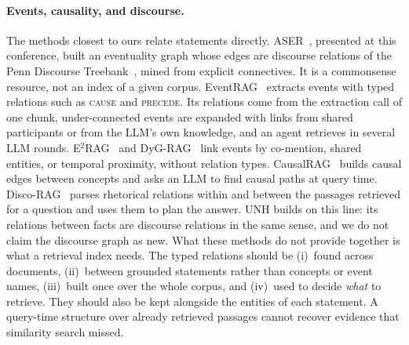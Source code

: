 \documentclass[sigconf, review, anonymous]{acmart}
\newcommand{\sys}{UNH}
\newcommand{\rel}[1]{\textsc{#1}}            %
\begin{document}
\paragraph{Events, causality, and discourse.}
The methods closest to ours relate statements directly. ASER~\cite{zhang2020aser}, presented at this conference, built an eventuality graph whose edges are discourse relations of the Penn Discourse Treebank~\cite{prasad2017penn}, mined from explicit connectives. It is a commonsense resource, not an index of a given corpus. EventRAG~\cite{yang2025eventrag} extracts events with typed relations such as \rel{cause} and \rel{precede}. Its relations come from the extraction call of one chunk, under-connected events are expanded with links from shared participants or from the LLM's own knowledge, and an agent retrieves in several LLM rounds. E$^2$RAG~\cite{zhang2026e2rag} and DyG-RAG~\cite{sun2025dygrag} link events by co-mention, shared entities, or temporal proximity, without relation types. CausalRAG~\cite{wang2025causalrag} builds causal edges between concepts and asks an LLM to find causal paths at query time. Disco-RAG~\cite{liu2026discorag} parses rhetorical relations within and between the passages retrieved for a question and uses them to plan the answer. \sys{} builds on this line: its relations between facts are discourse relations in the same sense, and we do not claim the discourse graph as new. What these methods do not provide together is what a retrieval index needs. The typed relations should be (i)~found across documents, (ii)~between grounded statements rather than concepts or event names, (iii)~built once over the whole corpus, and (iv)~used to decide \emph{what} to retrieve. They should also be kept alongside the entities of each statement. A query-time structure over already retrieved passages cannot recover evidence that similarity search missed.
\end{document}
